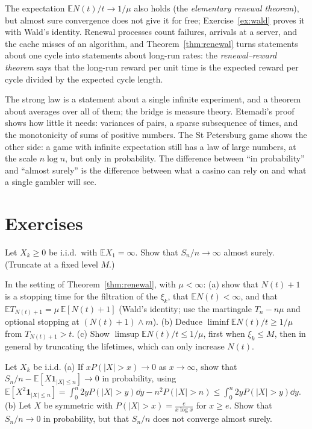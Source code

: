 The expectation $\mathbb E N(t)/t\to1/\mu$ also holds (the \emph{elementary renewal theorem}), but almost sure convergence does not give it for free;
Exercise~\ref{ex:wald} proves it with Wald's identity. Renewal processes count failures, arrivals at a server, and the cache misses of an algorithm,
and Theorem~\ref{thm:renewal} turns statements about one cycle into statements about long-run rates: the \emph{renewal--reward theorem} says that the long-run reward per unit time is the expected reward per cycle divided by the expected cycle length.

\begin{beauty}
The strong law is a statement about a single infinite experiment, and a theorem about averages over all of them; the bridge is measure theory.
Etemadi's proof shows how little it needs: variances of pairs, a sparse subsequence of times, and the monotonicity of sums of positive numbers. The
St Petersburg game shows the other side: a game with infinite expectation still has a law of large numbers, at the scale $n\log n$, but only in
probability. The difference between ``in probability'' and ``almost surely'' is the difference between what a casino can rely on and what a single
gambler will see.
\end{beauty}

\section{Exercises}

\begin{exercise}[$\star$]\label{ex:infmeanpos}
Let $X_k\ge0$ be i.i.d.\ with $\mathbb E X_1=\infty$. Show that $S_n/n\to\infty$ almost surely. (Truncate at a fixed level $M$.)
\end{exercise}

\begin{exercise}[$\star$]\label{ex:wald}
In the setting of Theorem~\ref{thm:renewal}, with $\mu<\infty$: (a) show that $N(t)+1$ is a stopping time for the filtration of the $\xi_k$, that
$\mathbb E N(t)<\infty$, and that $\mathbb E T_{N(t)+1}=\mu\,\mathbb E[N(t)+1]$ (Wald's identity; use the martingale $T_n-n\mu$ and optional stopping at
$(N(t)+1)\wedge m$). (b) Deduce $\liminf\mathbb E N(t)/t\ge1/\mu$ from $T_{N(t)+1}>t$. (c) Show $\limsup\mathbb E N(t)/t\le1/\mu$, first when $\xi_k\le M$,
then in general by truncating the lifetimes, which can only increase $N(t)$.
\end{exercise}

\begin{exercise}[$\star\star$]\label{ex:feller}
Let $X_k$ be i.i.d. (a) If $xP(|X|>x)\to0$ as $x\to\infty$, show that $S_n/n-\mathbb E[X\mathbf 1_{|X|\le n}]\to0$ in probability, using
$\mathbb E[X^2\mathbf 1_{|X|\le n}]=\int_0^n2yP(|X|>y)\dd y-n^2P(|X|>n)\le\int_0^n2yP(|X|>y)\dd y$. (b) Let $X$ be symmetric with $P(|X|>x)=\frac e{x\log x}$ for
$x\ge e$. Show that $S_n/n\to0$ in probability, but that $S_n/n$ does not converge almost surely.
\end{exercise}

